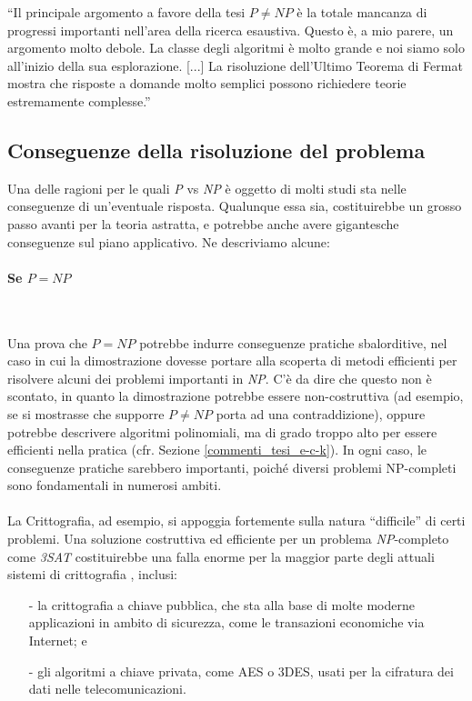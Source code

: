 \documentclass[12pt,a4paper]{report}
\theoremstyle{definition}
\begin{document}
``Il principale argomento a favore della tesi $P \neq NP$ è la totale mancanza di progressi importanti nell'area della ricerca esaustiva. Questo è, a mio parere, un argomento molto debole. La classe degli algoritmi è molto grande e noi siamo solo all'inizio della sua esplorazione. [...] La risoluzione dell'Ultimo Teorema di Fermat mostra che risposte a domande molto semplici possono richiedere teorie estremamente complesse.''\cite{Gasarch:tesi}


\subsection{Conseguenze della risoluzione del problema}

Una delle ragioni per le quali \emph{P} vs \emph{NP} è oggetto di molti studi sta nelle conseguenze di un'eventuale risposta. Qualunque essa sia, costituirebbe un grosso passo avanti per la teoria astratta, e potrebbe anche avere gigantesche conseguenze sul piano applicativo. Ne descriviamo alcune:

\paragraph{Se $P=NP$}\

Una prova che $P=NP$ potrebbe indurre conseguenze pratiche sbalorditive, nel caso in cui la dimostrazione dovesse portare alla scoperta di metodi efficienti per risolvere alcuni dei problemi importanti in \emph{NP}. C'è da dire che questo non è scontato, in quanto la dimostrazione potrebbe essere non-costruttiva (ad esempio, se si mostrasse che supporre $P \neq NP$ porta ad una contraddizione), oppure potrebbe descrivere algoritmi polinomiali, ma di grado troppo alto per essere efficienti nella pratica (cfr. Sezione \ref{commenti_tesi_e-c-k}). In ogni caso, le conseguenze pratiche sarebbero importanti, poiché diversi problemi NP-completi sono fondamentali in numerosi ambiti.\\
\\
La Crittografia, ad esempio, si appoggia fortemente sulla natura ``difficile'' di certi problemi. Una soluzione costruttiva ed efficiente per un problema \emph{NP}-completo come \emph{3SAT} costituirebbe una falla enorme per la maggior parte degli attuali sistemi di crittografia \cite{wikiP=NP:tesi}, inclusi:
\begin{itemize}
\item[-] la crittografia a chiave pubblica, che sta alla base di molte moderne applicazioni in ambito di sicurezza, come le transazioni economiche via Internet; e
\item[-] gli algoritmi a chiave privata, come AES o 3DES, usati per la cifratura dei dati nelle telecomunicazioni.
\end{itemize}
\end{document}
